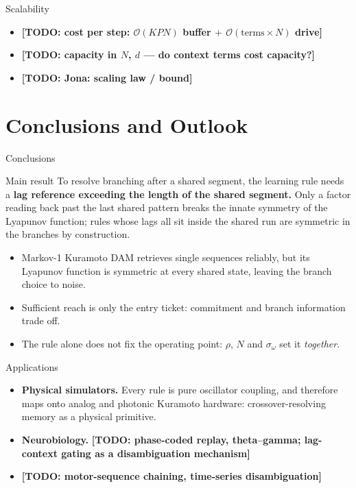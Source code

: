 \documentclass[aspectratio=169]{beamer}
\newcommand{\TODO}[1]{{\color{red}\textbf{[TODO: #1]}}}
\begin{document}
\begin{frame}{Scalability}
  \begin{itemize}
    \item \TODO{cost per step: $\mathcal{O}(KPN)$ buffer $+$
      $\mathcal{O}(\text{terms}\times N)$ drive}
    \item \TODO{capacity in $N$, $d$ --- do context terms cost capacity?}
    \item \TODO{Jona: scaling law / bound}
  \end{itemize}
\end{frame}


\section[Conclusions]{Conclusions and Outlook}

\begin{frame}{Conclusions}
  \begin{block}{Main result}
    To resolve branching after a shared segment, the learning rule needs a
    \textbf{lag reference exceeding the length of the shared segment.} Only a
    factor reading back past the last shared pattern breaks the innate
    symmetry of the Lyapunov function; rules whose lags all sit inside the
    shared run are symmetric in the branches by construction.
  \end{block}
  \begin{itemize}
    \item Markov-1 Kuramoto DAM retrieves single sequences reliably, but its
      Lyapunov function is symmetric at every shared state, leaving the
      branch choice to noise.
    \item Sufficient reach is only the entry ticket: commitment and
      branch information trade off.
    \item The rule alone does not fix the operating point: $\rho$, $N$ and
      $\sigma_\omega$ set it \emph{together}.
  \end{itemize}
\end{frame}

\begin{frame}{Applications}
  \begin{itemize}
    \item \textbf{Physical simulators.} Every rule is pure oscillator
      coupling, and therefore maps onto analog and photonic Kuramoto
      hardware: crossover-resolving memory as a physical primitive.
    \item \textbf{Neurobiology.} \TODO{phase-coded replay, theta--gamma;
      lag-context gating as a disambiguation mechanism}
    \item \TODO{motor-sequence chaining, time-series disambiguation}
  \end{itemize}
\end{frame}
\end{document}
